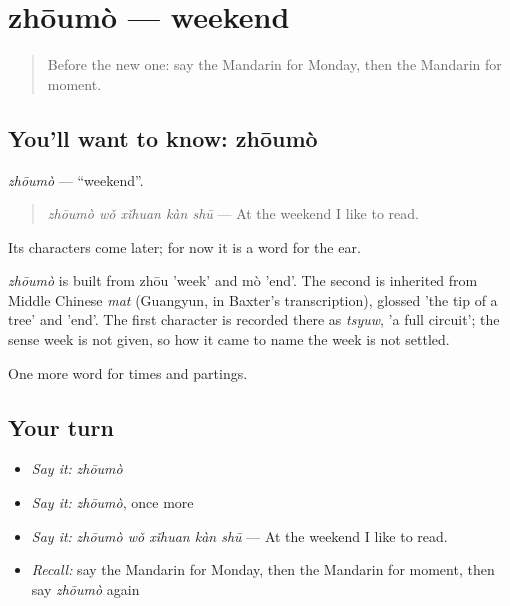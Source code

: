 \section[zhōumò]{zhōumò — weekend}

\label{lesson:ZH-C46-zhoumo}



\begin{quote}
Before the new one: say the Mandarin for Monday, then the Mandarin for moment.
\end{quote}

\subsection*{You'll want to know: zhōumò}
\emph{zhōumò} — \textquotedblleft{}weekend\textquotedblright{}.

\begin{quote}
\emph{zhōumò wǒ xǐhuan kàn shū} — At the weekend I like to read.
\end{quote}

Its characters come later; for now it is a word for the ear.

\begin{cousinweb}
\emph{zhōumò} is built from zhōu 'week' and mò 'end'. The second is inherited from Middle Chinese \emph{mat} (Guangyun, in Baxter's transcription), glossed 'the tip of a tree' and 'end'. The first character is recorded there as \emph{tsyuw}, 'a full circuit'; the sense week is not given, so how it came to name the week is not settled.
\end{cousinweb}

\begin{grammarlens}[title={What you've built}]
One more word for times and partings.
\end{grammarlens}

\subsection*{Your turn}
\begin{itemize}
\raggedright
  \item \emph{Say it:} \emph{zhōumò}
  \item \emph{Say it:} \emph{zhōumò}, once more
  \item \emph{Say it:} \emph{zhōumò wǒ xǐhuan kàn shū} — At the weekend I like to read.
  \item \emph{Recall:} say the Mandarin for Monday, then the Mandarin for moment, then say \emph{zhōumò} again
\end{itemize}

